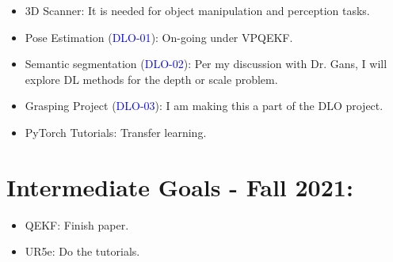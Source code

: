 \documentclass[11pt]{article}
\begin{document}
\begin{itemize}
    \item 3D Scanner: It is needed for object manipulation and perception tasks.



    \item Pose Estimation (\textcolor{blue}{DLO-01}): On-going under VPQEKF.
    \item Semantic segmentation (\textcolor{blue}{DLO-02}): Per my discussion with Dr. Gans, I
    will explore DL methods for the depth or scale problem.
    \item Grasping Project (\textcolor{blue}{DLO-03}): I am making this a part of the DLO project.
    \item PyTorch Tutorials: Transfer learning.

  \end{itemize}

\section{Intermediate Goals - Fall 2021:}
\begin{itemize}
      \item QEKF: Finish paper.
      \item UR5e: Do the tutorials.
\end{itemize}

\newpage

% 
% 
\end{document}
